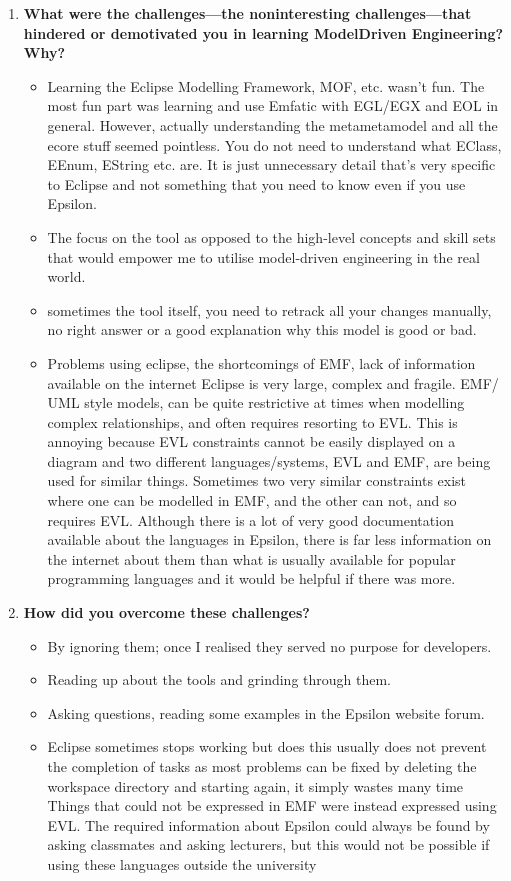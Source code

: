 \documentclass[12pt, a4paper]{report} \usepackage[titletoc]{appendix}
\begin{document}
\begin{appendices}
\begin{enumerate}
\item \textbf{ What were the challenges---the non­interesting challenges---that hindered or demotivated you in learning Model­Driven Engineering? Why?}
\begin{itemize}
\item Learning the Eclipse Modelling Framework, MOF, etc. wasn't fun. The most fun part was learning and use Emfatic with EGL/EGX and EOL in general. However, actually understanding the meta­metamodel and all the ecore stuff seemed pointless. You do not need to understand what EClass, EEnum, EString etc. are. It is just unnecessary detail that's very specific to
Eclipse and not something that you need to know even if you use Epsilon.
\item The focus on the tool as opposed to the high-level concepts and skill sets that would empower me to utilise model-driven engineering in the real world.
\item sometimes the tool itself, you need to re­track all your changes manually, no right answer or a good explanation why this model is good or bad.
\item Problems using eclipse, the shortcomings of EMF, lack of information available on the internet Eclipse is very large, complex and fragile. EMF/ UML ­style models, can be quite restrictive at times when modelling complex relationships, and often requires resorting to EVL. This is annoying because EVL constraints cannot be easily displayed on a diagram and two different languages/systems, EVL and EMF, are being used for similar things. Sometimes two very similar constraints exist where one can be modelled in EMF, and the other can not, and so requires EVL. Although there is a lot of very good documentation available about the languages in Epsilon, there is far less information on the internet about them than what is usually available for popular programming languages and it would be helpful if there was more.
\end{itemize}

\item \textbf{How did you overcome these challenges?}
\begin{itemize}
\item By ignoring them; once I realised they served no purpose for developers.
\item Reading up about the tools and grinding through them.
\item Asking questions, reading some examples in the Epsilon website forum.
\item Eclipse sometimes stops working but does this usually does not prevent the completion of tasks as most problems can be fixed by deleting the workspace directory and starting again, it simply wastes many time Things that could not be expressed in EMF were instead expressed using EVL. The required information about Epsilon could always be found by
asking classmates and asking lecturers, but this would not be possible if using these languages outside the university
\end{itemize}
\end{enumerate}


\end{appendices}
\end{document}
